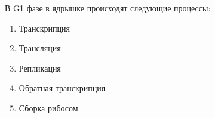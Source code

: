 
В G1 фазе в ядрышке происходят
следующие процессы:

\begin{enumerate}
    \item Транскрипция
    \item Трансляция
    \item Репликация
    \item Обратная транскрипция
    \item Сборка рибосом
\end{enumerate}

\explanationSection

